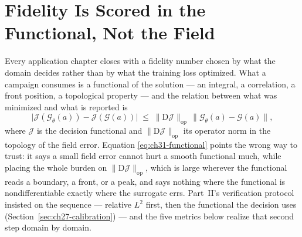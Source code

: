 \section{Fidelity Is Scored in the Functional, Not the Field}
\label{sec:ch31-fidelity}

Every application chapter closes with a fidelity number chosen by what the domain decides rather
than by what the training loss optimized. What a campaign consumes is a functional of the
solution --- an integral, a correlation, a front position, a topological property --- and the
relation between what was minimized and what is reported is
\begin{equation}
  \label{eq:ch31-functional}
  \bigl| \mathcal{J}(\mathcal{G}_{\theta}(a)) - \mathcal{J}(\mathcal{G}(a)) \bigr|
  \;\le\; \bigl\| \mathrm{D}\mathcal{J} \bigr\|_{\mathrm{op}}\,
            \bigl\| \mathcal{G}_{\theta}(a) - \mathcal{G}(a) \bigr\| ,
\end{equation}
where $\mathcal{J}$ is the decision functional and $\|\mathrm{D}\mathcal{J}\|_{\mathrm{op}}$ its
operator norm in the topology of the field error. Equation \eqref{eq:ch31-functional} points the
wrong way to trust: it says a small field error cannot hurt a smooth functional much, while
placing the whole burden on $\|\mathrm{D}\mathcal{J}\|_{\mathrm{op}}$, which is large wherever the
functional reads a boundary, a front, or a peak, and says nothing where the functional is
nondifferentiable exactly where the surrogate errs. Part~II's verification protocol insisted on
the sequence --- relative $L^{2}$ first, then the functional the decision uses
(Section~\ref{sec:ch27-calibration}) --- and the five metrics below realize that second step
domain by domain.

